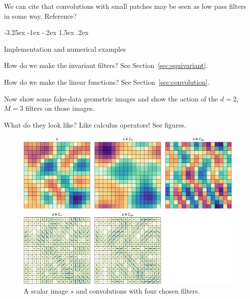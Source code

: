 \documentclass{article}
\makeatletter
\newenvironment{hoggfigure}{%
  \begin{figure}[tp]%
    \begin{mdframed}%
    \color{captiongray}}{%
    \end{mdframed}%
  \end{figure}}
\theoremstyle{plain}
\newcommand{\sectionname}{Section}
\newcommand{\secref}[1]{\sectionname~\ref{#1}}
\renewcommand\section{\@startsection {section}{1}{\z@}%
  {-3.25ex \@plus -1ex \@minus -.2ex}%
  {1.5ex \@plus .2ex}%
  {\raggedright\normalfont\large\bfseries}}%
\makeatother
\begin{document}
We can cite that convolutions with small patches may be seen as low pass filters in some way. Reference?

\section{Implementation and numerical examples}\label{sec:examples}

How do we make the invariant filters? See \secref{sec:equivariant}.

How do we make the linear functions? See \secref{sec:convolution}.

Now show some fake-data geometric images and show the action of the $d=2$, $M=3$ filters on those images.

What do they look like? Like calculus operators! See figures.
\begin{hoggfigure}
  \begin{center}
    \includegraphics[width=\textwidth]{notebooks/monomials_1.png}
  \end{center}
  \caption{A scalar image $s$ and convolutions with four chosen filters.}
\end{hoggfigure}
\end{document}
